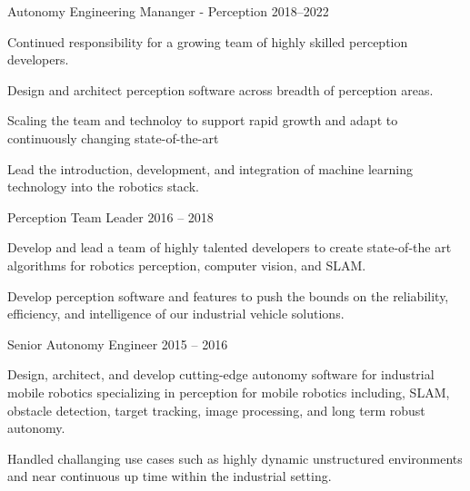 \documentclass[11pt, a4paper]{awesome-cv}
\begin{document}
\begin{cventries}
\vspace*{-2mm}
\cventry
  {Autonomy Engineering Mananger - Perception}
  {}
  {}
  {2018--2022}
  {
    \begin{cvitems}
      \item Continued responsibility for a growing team of highly skilled perception developers.     
      \item Design and architect perception software across breadth of perception areas.
      \item Scaling the team and technoloy to support rapid growth and adapt to continuously changing state-of-the-art
      \item Lead the introduction, development, and integration of machine learning technology into the robotics stack.
     \end{cvitems} 
  }

\vspace*{-2mm}
\cventry
  {Perception Team Leader} 
  {}
  {}
  {2016 -- 2018}
  {
    \begin{cvitems}
      \item Develop and lead a team of highly talented developers to create state-of-the art algorithms for robotics perception, computer vision, and SLAM.
      \item Develop perception software and features to push the bounds on the reliability, efficiency, and intelligence of our industrial vehicle solutions.
    \end{cvitems} 
  }

\vspace*{-2mm}
\cventry
  {Senior Autonomy Engineer} 
  {}
  {}
  {2015 -- 2016}
  {
    \begin{cvitems}
      \item Design, architect, and develop cutting-edge autonomy software for industrial mobile robotics specializing in perception for mobile robotics including, SLAM, obstacle detection, target tracking, image processing, and long term robust autonomy.
      \item Handled challanging use cases such as highly dynamic unstructured environments and near continuous up time within the industrial setting.
    \end{cvitems} 
  }


\end{cventries}
\end{document}
